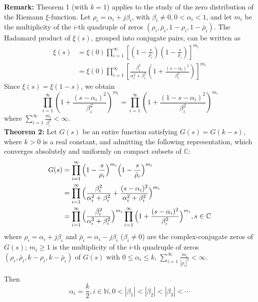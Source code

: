 \documentclass[12pt]{article}
\begin{document}
\textbf{Remark:} Theorem 1 (with $k=1$) applies to the study of the zero distribution of the Riemann \(\xi\)-function. Let \(\rho_i=\alpha_i+j\beta_i\), with \(\beta_i\neq 0, 0<\alpha_i<1\), and let \(m_i\) be the multiplicity of the $i$-th quadruple of zeros $(\rho_i, \bar\rho_i, 1-\rho_i, 1-\bar\rho_i)$. The Hadamard product of \(\xi(s)\), grouped into conjugate pairs, can be written as
\[
\begin{aligned}
\xi(s)
&=\xi(0)\prod_{i=1}^{\infty}
\left[\left(1-\frac{s}{\rho_i}\right)
\left(1-\frac{s}{\bar\rho_i}\right)\right]^{m_i}\\
&=\xi(0)\prod_{i=1}^{\infty}
\left[
\frac{\beta_i^2}{\alpha_i^2+\beta_i^2}
\left(1+\frac{(s-\alpha_i)^2}{\beta_i^2}\right)
\right]^{m_i}
\end{aligned}
\]
Since \(\xi(s)=\xi(1-s)\), we obtain
\[
\prod_{i=1}^{\infty}
\left(1+\frac{(s-\alpha_i)^2}{\beta_i^2}\right)^{m_i}
=
\prod_{i=1}^{\infty}
\left(1+\frac{(1-s-\alpha_i)^2}{\beta_i^2}\right)^{m_i}
\]
where \(\sum_{i=1}^{\infty}\frac{m_i}{\beta_i^2}<\infty\).\\

\textbf{Theorem 2:} Let $G(s)$ be an entire function satisfying $G(s)=G(k-s)$, where $k >0 $ is a real constant, and admitting the following representation, which converges absolutely and uniformly on compact subsets of $\mathbb C$:
\begin{equation}\begin{split}
G(s)
&=\prod_{i=1}^{\infty}\Big{(}1-\frac{s}{\rho_i}\Big{)}^{m_{i}}\Big{(}1-\frac{s}{\bar{\rho}_i}\Big{)}^{m_{i}}\\
&=\prod_{i=1}^{\infty}\Big{(}\frac{\beta_i^2}{\alpha_i^2 + \beta_i^2}+\frac{(s-\alpha_i)^2}{\alpha_i^2+\beta_i^2}\Big{)}^{m_{i}}\\
&=\prod_{i=1}^{\infty} \Big{(}\frac{\beta_i^2}{\alpha_i^2 + \beta_i^2}\Big{)}^{m_i}\prod_{i=1}^{\infty} \Big{(}1+\frac{(s-\alpha_i)^2}{\beta_i^2}\Big{)}^{m_i}, s \in \mathbb{C}
\end{split}\end{equation}
where $\rho_i=\alpha_i+j\beta_i$ and $\bar\rho_i=\alpha_i-j\beta_i$ ($\beta_i\neq 0$)
      are the complex-conjugate zeros of $G(s)$; $m_i \geq 1$ is the multiplicity of the $i$-th quadruple of zeros $(\rho_i, \bar\rho_i, k-\rho_i, k-\bar\rho_i)$ of $G(s)$ with $0 \leq \alpha_i \leq k$, $\sum_{i=1}^{\infty}\frac{m_i}{|\rho_i|^2}<\infty$.

Then
\begin{equation}
 \alpha_i=\frac{k}{2}, i\in\mathbb{N}, 0<|\beta_1|<|\beta_2|<|\beta_3|<\cdots
\end{equation}
\end{document}
